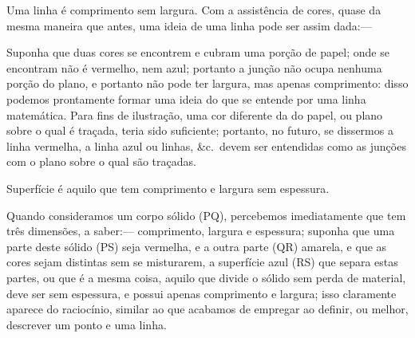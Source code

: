 \documentclass[booklanguage=brazilian]{byrnebook}
\begin{document}
Uma linha é comprimento sem largura. Com a assistência de cores, quase da mesma maneira que antes, uma ideia de uma linha pode ser assim dada:—

\drawCurrentPictureInMargin
Suponha que duas cores se encontrem e cubram uma porção de papel; onde se encontram não é vermelho, nem azul; portanto a junção não ocupa nenhuma porção do plano, e portanto não pode ter largura, mas apenas comprimento: disso podemos prontamente formar uma ideia do que se entende por uma linha matemática. Para fins de ilustração, uma cor diferente da do papel, ou plano sobre o qual é traçada, teria sido suficiente; portanto, no futuro, se dissermos a linha vermelha, a linha azul ou linhas, \&c.\ devem ser entendidas como as junções com o plano sobre o qual são traçadas.

\drawCurrentPictureInMargin
Superfície é aquilo que tem comprimento e largura sem espessura.

Quando consideramos um corpo sólido (PQ), percebemos imediatamente que tem três dimensões, a saber:— comprimento, largura e espessura; suponha que uma parte deste sólido (PS) seja vermelha, e a outra parte (QR) amarela, e que as cores sejam distintas sem se misturarem, a superfície azul (RS) que separa estas partes, ou que é a mesma coisa, aquilo que divide o sólido sem perda de material, deve ser sem espessura, e possui apenas comprimento e largura; isso claramente aparece do raciocínio, similar ao que acabamos de empregar ao definir, ou melhor, descrever um ponto e uma linha.
\end{document}
